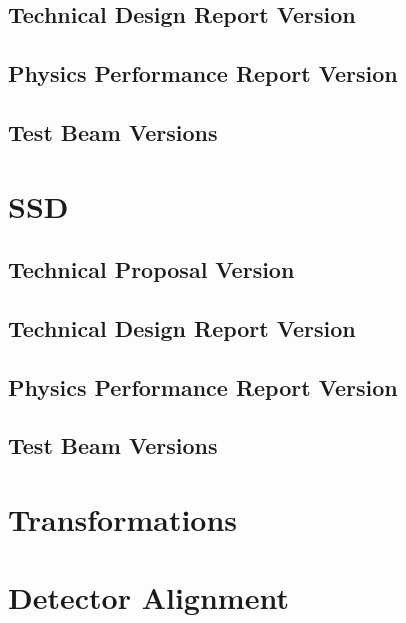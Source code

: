 \subsection{Technical Design Report Version}

\subsection{Physics Performance Report Version}

\subsection{Test Beam Versions}

\section{SSD}

\subsection{Technical Proposal Version}

\subsection{Technical Design Report Version}

\subsection{Physics Performance Report Version}

\subsection{Test Beam Versions}

\section{Transformations}

\section{Detector Alignment}